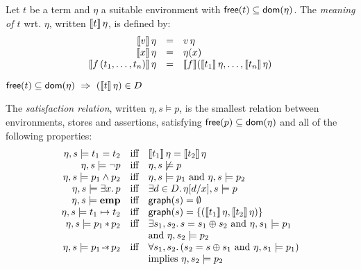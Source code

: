 \documentclass[12pt,a4paper]{article}
\newcommand{\emp}{\ensuremath{\mathbf{emp}}}
\begin{document}
\begin{definition}
  Let $t$ be a term and $\eta$ a suitable environment with $\mathsf{free}(t) \subseteq \mathsf{dom}(\eta)$.
  The {\em meaning of $t$} wrt. $\eta$, written $\llbracket t\rrbracket\,\eta$, is defined by:
  \[\begin{array}{rcl}
    \llbracket v\rrbracket\,\eta
    &=& v\,\eta \\
    \llbracket x\rrbracket\,\eta
    &=& \eta(x) \\
    \llbracket f\,(t_1,\ldots,t_n)\rrbracket\,\eta
    &=& \llbracket f\rrbracket(\llbracket t_1\rrbracket\,\eta,\ldots,\llbracket t_n\rrbracket\,\eta)
  \end{array}\]
\end{definition}

\begin{lemma}
  $\free{t} \subseteq \dom{\eta} \ \Rightarrow\  (\semantic{t}\,\eta)\in D$
\end{lemma}

\begin{definition}
  The {\em satisfaction relation}, written $\eta,s \models p$, is the smallest relation between 
  environments, stores and assertions, satisfying $\mathsf{free}(p) \subseteq \mathsf{dom}(\eta)$ and all of the
  following properties:
  \[\begin{array}{rcl}
    \eta,s \models t_1 = t_2
    &\text{iff}& \semantic{t_1}\,\eta = \semantic{t_2}\,\eta \\
    \eta,s \models \neg p
    &\text{iff}& \eta,s \not\models p \\
    \eta,s \models p_1 \wedge p_2
    &\text{iff}& \eta,s \models p_1 \text{ and } \eta,s \models p_2 \\
    \eta,s \models \exists x.\,p
    &\text{iff}& \exists d \in D.\,\eta[d/x],s \models p \\
    \eta,s \models \emp
    &\text{iff}& \grph{s} = \emptyset \\
    \eta,s \models t_1 \mapsto t_2
    &\text{iff}& \grph{s} = \{(\semantic{t_1}\,\eta,\semantic{t_2}\,\eta)\} \\
    \eta,s \models p_1 \sepcon p_2
    &\text{iff}& \exists s_1,s_2.\,s=s_1 \oplus s_2 \text{ and } \eta,s_1 \models p_1 \\
    && \text{and } \eta,s_2 \models p_2 \\
    \eta,s \models p_1 \sepimp p_2
    &\text{iff}& \forall s_1,s_2.\,(s_2 = s \oplus s_1 \text{ and } \eta,s_1 \models p_1) \\
    && \text{implies } \eta,s_2 \models p_2
  \end{array}\]
\end{definition}
\end{document}
